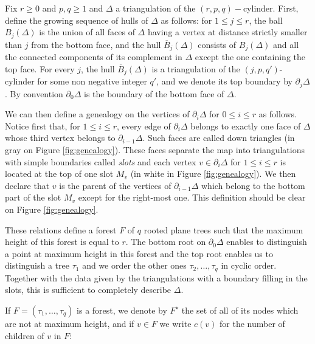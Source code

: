 \documentclass[10pt]{amsart}
\theoremstyle{definition}\newtheorem{defi}[theo]{Definition}\newtheorem{rema}[theo]{Remark}\newtheorem{exam}[theo]{Example}\newtheorem{exem}[theo]{Example}\newtheorem{nota}[theo]{Notation}
\begin{document}
Fix $r \geq 0$ and $p,q\geq1$ and $\Delta$ a triangulation of the $(r,p,q)-$cylinder. First, define the growing sequence of hulls of $\Delta$ as follows: for $1 \leq j \leq r$, the ball $B_j(\Delta)$ is the union of all faces of $\Delta$ having a vertex at distance strictly smaller than $j$ from the bottom face, and the hull $\overline{B}_j (\Delta)$ consists of $B_j(\Delta)$ and all the connected components of its complement in $\Delta$ except the one containing the top face.  For every $j$, the hull $\overline{B}_j (\Delta)$ is a triangulation of the $(j,p,q')$-cylinder for some non negative integer $q'$, and we denote its top boundary by $\partial_j \Delta$. By convention $\partial_0 \Delta$ is the boundary of the bottom face of $\Delta$.

We can then define a genealogy on the vertices of $\partial_i \Delta$ for $0 \leq i \leq r$ as follows.
Notice first that, for $1 \leq i \leq r$, every edge of $\partial_i \Delta$ belongs to exactly one face of $\Delta$ whose third vertex belongs to $\partial_{i-1} \Delta$. Such faces are called down triangles (in gray on Figure \ref{fig:genealogy}). These faces separate the map into triangulations with simple boundaries called \emph{slots} and each vertex $v \in \partial_i \Delta$ for $1 \leq i \leq r$ is located at the top of one slot $M_{v}$ (in white in Figure \ref{fig:genealogy}). We then declare that $v$ is the parent of the vertices of $\partial _{i-1} \Delta$ which belong to the bottom part of the slot $M_{v}$ except for the right-most one. This definition should be clear on
Figure \ref{fig:genealogy}.

These relations define a forest $F$ of $q$ rooted plane trees such that the maximum height of this forest is equal to $r$. The bottom root on $\partial_{0} \Delta$ enables to distinguish a point at maximum height in this forest and the top root enables us to distinguish a tree $\tau_{1}$ and we order the other ones $\tau_{2}, \dots , \tau_{q}$ in cyclic order. Together with the data given by the triangulations with a boundary filling in the slots, this is sufficient to completely describe $\Delta$.

If $F = (\tau_{1}, \dots , \tau_{q})$ is a forest, we denote by $F^{\star}$ the set of all of its nodes which are not at maximum height, and if $v \in F$ we write $c(v)$ for the number of children of $v$ in $F$:


\begin{center}
\end{center}
\end{document}
